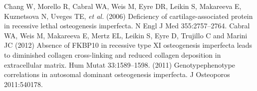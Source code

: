 \begin{biblio}[Referencies]

   Chang W, Morello R, Cabral WA, Weis M, Eyre DR, Leikin S,
Makareeva E, Kuznetsova N, Uveges TE, \textit{et al.} (2006) Deficiency
                    of cartilage-associated protein in recessive lethal osteogenesis imperfecta. N
                    Engl J Med 355:2757–2764.
 Cabral WA, Weis M, Makareeva E, Mertz EL, Leikin S, Eyre
D, Trujillo C and Marini JC (2012) Absence of FKBP10 in recessive type XI
                    osteogenesis imperfecta leads to diminished collagen cross-linking and reduced
                    collagen deposition in extracellular matrix. Hum Mutat
                    33:1589–1598.
\titidem (2011) Genotypephenotype
                    correlations in autosomal dominant osteogenesis imperfecta. J Osteoporos
                    2011:540178.

\end{biblio}
